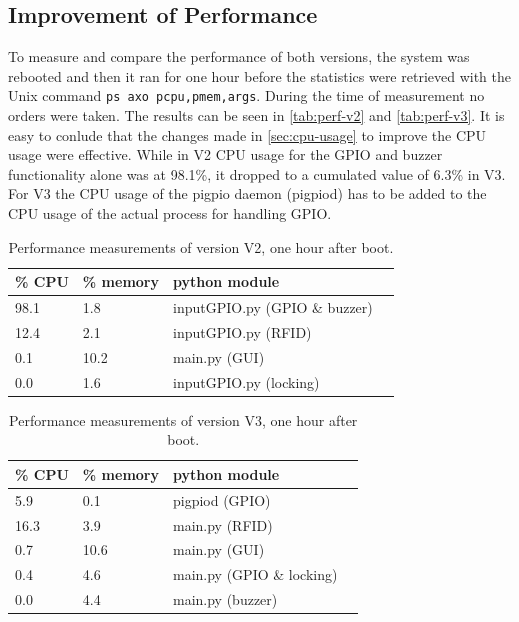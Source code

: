 \documentclass[12pt]{article}
\begin{document}
\subsection{Improvement of Performance}
To measure and compare the performance of both versions, the system was rebooted and then it ran for one hour before the
statistics were retrieved with the Unix command \texttt{ps axo pcpu,pmem,args}.
During the time of measurement no orders were taken.
The results can be seen in \autoref{tab:perf-v2} and \autoref{tab:perf-v3}.
It is easy to conlude that the changes made in \ref{sec:cpu-usage} to improve the CPU usage were effective. 
While in V2 CPU usage for the GPIO and buzzer functionality alone was at 98.1\%,
it dropped to a cumulated value of 6.3\% in V3.
For V3 the CPU usage of the pigpio daemon (pigpiod) has to be added to the CPU usage of the actual process for handling GPIO.

  \begin{table}[H]
  \centering
  \begin{tabular}{lllr}
   \hline
  \% CPU & \% memory & python module\\ 
  \hline
  98.1 & 1.8  & inputGPIO.py (GPIO \& buzzer)\\
  12.4 & 2.1  & inputGPIO.py (RFID)\\
  0.1  & 10.2 & main.py (GUI)\\
  0.0  & 1.6  & inputGPIO.py (locking)\\
  \hline
  \end{tabular}
  \caption{Performance measurements of version V2, one hour after boot.}
  \label{tab:perf-v2}
  \end{table}
  
  \begin{table}[H]
  \centering
  \begin{tabular}{lllr}
   \hline
  \% CPU & \% memory & python module\\ 
  \hline
  5.9  & 0.1  & pigpiod (GPIO)\\
  16.3 & 3.9  & main.py (RFID)\\  
  0.7  & 10.6 & main.py (GUI)\\
  0.4  & 4.6  & main.py (GPIO \& locking)\\
  0.0  & 4.4  & main.py (buzzer)\\
  \hline
  \end{tabular}
  \caption{Performance measurements of version V3, one hour after boot.}
  \label{tab:perf-v3}
  \end{table}
\end{document}
